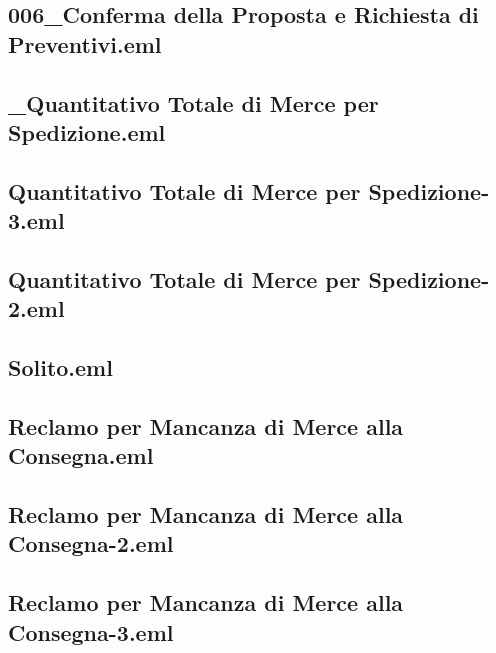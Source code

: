\documentclass[a4paper,12pt]{report}
\begin{document}
\subsection{006\_Conferma della Proposta e Richiesta di Preventivi.eml} \label{email6}
\vspace{5pt}


\subsection{\_Quantitativo Totale di Merce per Spedizione.eml} \label{email7}
\vspace{5pt}


\subsection{Quantitativo Totale di Merce per Spedizione-3.eml} \label{email8}
\vspace{5pt}


\subsection{Quantitativo Totale di Merce per Spedizione-2.eml} \label{email9}
\vspace{5pt}


\subsection{Solito.eml} \label{email10}
\vspace{5pt}


\subsection{Reclamo per Mancanza di Merce alla Consegna.eml} \label{email11}
\vspace{5pt}


\subsection{Reclamo per Mancanza di Merce alla Consegna-2.eml} \label{email12}
\vspace{5pt}


\subsection{Reclamo per Mancanza di Merce alla Consegna-3.eml} \label{email13}
\vspace{5pt}

\end{document}
